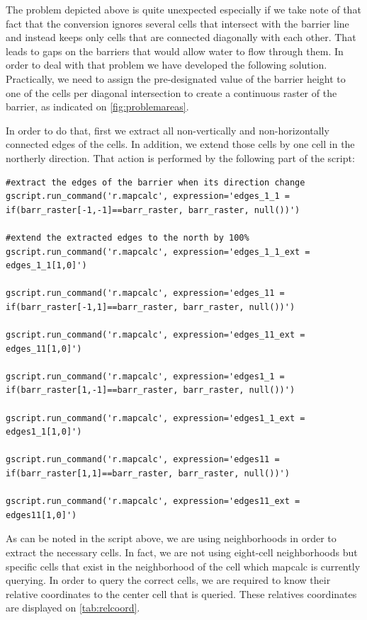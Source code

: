 The problem depicted above is quite unexpected especially if we take note of that fact that the conversion ignores several cells that intersect with the barrier line and instead keeps only cells that are connected diagonally with each other. That leads to gaps on the barriers that would allow water to flow through them. In order to deal with that problem we have developed the following solution. \\
Practically, we need to assign the pre-designated value of the barrier height to one of the cells per diagonal intersection to create a continuous raster of the barrier, as indicated on \autoref{fig:problemareas}. 

In order to do that, first we extract all non-vertically and non-horizontally connected edges of the cells. In addition, we extend those cells by one cell in the northerly direction. That action is performed by the following part of the script:

\begin{lstlisting}
#extract the edges of the barrier when its direction change 
gscript.run_command('r.mapcalc', expression='edges_1_1 = if(barr_raster[-1,-1]==barr_raster, barr_raster, null())')

#extend the extracted edges to the north by 100%
gscript.run_command('r.mapcalc', expression='edges_1_1_ext = edges_1_1[1,0]')

gscript.run_command('r.mapcalc', expression='edges_11 = if(barr_raster[-1,1]==barr_raster, barr_raster, null())')

gscript.run_command('r.mapcalc', expression='edges_11_ext = edges_11[1,0]')

gscript.run_command('r.mapcalc', expression='edges1_1 = if(barr_raster[1,-1]==barr_raster, barr_raster, null())')

gscript.run_command('r.mapcalc', expression='edges1_1_ext = edges1_1[1,0]')

gscript.run_command('r.mapcalc', expression='edges11 = if(barr_raster[1,1]==barr_raster, barr_raster, null())')

gscript.run_command('r.mapcalc', expression='edges11_ext = edges11[1,0]')
\end{lstlisting}

As can be noted in the script above, we are using neighborhoods in order to extract the necessary cells. In fact, we are not using eight-cell neighborhoods but specific cells that exist in the neighborhood of the cell which mapcalc is currently querying. In order to query the correct cells, we are required to know their relative coordinates to the center cell that is queried. These relatives coordinates are displayed on \autoref{tab:relcoord}.\\

